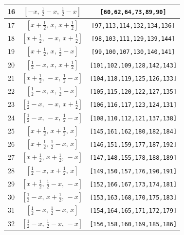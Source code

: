 \documentclass[fleqn,8pt]{jsarticle}
\begin{document}
\begin{longtable}{ccc}
16 & $\left[ - x,\, \frac{1}{2} - x,\, \frac{1}{2} - x \right]$ & {\tt [60,62,64,73,89,90]} \\ \hline
17 & $\left[ x + \frac{1}{2},\, x,\, x + \frac{1}{2} \right]$ & {\tt [97,113,114,132,134,136]} \\ \hline
18 & $\left[ x + \frac{1}{2},\, - x,\, x + \frac{1}{2} \right]$ & {\tt [98,103,111,129,139,144]} \\ \hline
19 & $\left[ x + \frac{1}{2},\, x,\, \frac{1}{2} - x \right]$ & {\tt [99,100,107,130,140,141]} \\ \hline
20 & $\left[ \frac{1}{2} - x,\, x,\, x + \frac{1}{2} \right]$ & {\tt [101,102,109,128,142,143]} \\ \hline
21 & $\left[ x + \frac{1}{2},\, - x,\, \frac{1}{2} - x \right]$ & {\tt [104,118,119,125,126,133]} \\ \hline
22 & $\left[ \frac{1}{2} - x,\, x,\, \frac{1}{2} - x \right]$ & {\tt [105,115,120,122,127,135]} \\ \hline
23 & $\left[ \frac{1}{2} - x,\, - x,\, x + \frac{1}{2} \right]$ & {\tt [106,116,117,123,124,131]} \\ \hline
24 & $\left[ \frac{1}{2} - x,\, - x,\, \frac{1}{2} - x \right]$ & {\tt [108,110,112,121,137,138]} \\ \hline
25 & $\left[ x + \frac{1}{2},\, x + \frac{1}{2},\, x \right]$ & {\tt [145,161,162,180,182,184]} \\ \hline
26 & $\left[ x + \frac{1}{2},\, \frac{1}{2} - x,\, x \right]$ & {\tt [146,151,159,177,187,192]} \\ \hline
27 & $\left[ x + \frac{1}{2},\, x + \frac{1}{2},\, - x \right]$ & {\tt [147,148,155,178,188,189]} \\ \hline
28 & $\left[ \frac{1}{2} - x,\, x + \frac{1}{2},\, x \right]$ & {\tt [149,150,157,176,190,191]} \\ \hline
29 & $\left[ x + \frac{1}{2},\, \frac{1}{2} - x,\, - x \right]$ & {\tt [152,166,167,173,174,181]} \\ \hline
30 & $\left[ \frac{1}{2} - x,\, x + \frac{1}{2},\, - x \right]$ & {\tt [153,163,168,170,175,183]} \\ \hline
31 & $\left[ \frac{1}{2} - x,\, \frac{1}{2} - x,\, x \right]$ & {\tt [154,164,165,171,172,179]} \\ \hline
32 & $\left[ \frac{1}{2} - x,\, \frac{1}{2} - x,\, - x \right]$ & {\tt [156,158,160,169,185,186]} \\
\end{longtable}
\renewcommand{\arraystretch}{1.2}
\end{document}
